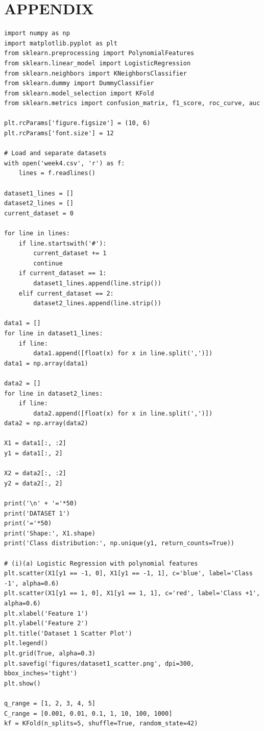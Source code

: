 \documentclass[11pt,a4paper]{article}
\begin{document}
\newpage
\section*{APPENDIX}

\begin{lstlisting}
import numpy as np
import matplotlib.pyplot as plt
from sklearn.preprocessing import PolynomialFeatures
from sklearn.linear_model import LogisticRegression
from sklearn.neighbors import KNeighborsClassifier
from sklearn.dummy import DummyClassifier
from sklearn.model_selection import KFold
from sklearn.metrics import confusion_matrix, f1_score, roc_curve, auc

plt.rcParams['figure.figsize'] = (10, 6)
plt.rcParams['font.size'] = 12

# Load and separate datasets
with open('week4.csv', 'r') as f:
    lines = f.readlines()

dataset1_lines = []
dataset2_lines = []
current_dataset = 0

for line in lines:
    if line.startswith('#'):
        current_dataset += 1
        continue
    if current_dataset == 1:
        dataset1_lines.append(line.strip())
    elif current_dataset == 2:
        dataset2_lines.append(line.strip())

data1 = []
for line in dataset1_lines:
    if line:
        data1.append([float(x) for x in line.split(',')])
data1 = np.array(data1)

data2 = []
for line in dataset2_lines:
    if line:
        data2.append([float(x) for x in line.split(',')])
data2 = np.array(data2)

X1 = data1[:, :2]
y1 = data1[:, 2]

X2 = data2[:, :2]
y2 = data2[:, 2]

print('\n' + '='*50)
print('DATASET 1')
print('='*50)
print('Shape:', X1.shape)
print('Class distribution:', np.unique(y1, return_counts=True))

# (i)(a) Logistic Regression with polynomial features
plt.scatter(X1[y1 == -1, 0], X1[y1 == -1, 1], c='blue', label='Class -1', alpha=0.6)
plt.scatter(X1[y1 == 1, 0], X1[y1 == 1, 1], c='red', label='Class +1', alpha=0.6)
plt.xlabel('Feature 1')
plt.ylabel('Feature 2')
plt.title('Dataset 1 Scatter Plot')
plt.legend()
plt.grid(True, alpha=0.3)
plt.savefig('figures/dataset1_scatter.png', dpi=300, bbox_inches='tight')
plt.show()

q_range = [1, 2, 3, 4, 5]
C_range = [0.001, 0.01, 0.1, 1, 10, 100, 1000]
kf = KFold(n_splits=5, shuffle=True, random_state=42)


\end{lstlisting}
\end{document}
